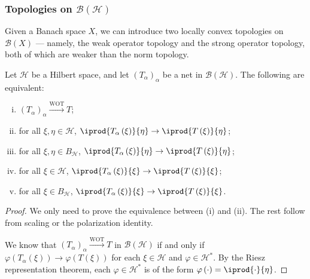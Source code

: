 \documentclass[10pt]{mypackage}
\begin{document}
\subsubsection{Topologies on $\mathcal{B}\left(\mathcal{H}\right)$}%
Given a Banach space $X$, we can introduce two locally convex topologies on $\mathcal{B}\left(X\right)$ --- namely, the weak operator topology and the strong operator topology, both of which are weaker than the norm topology.
\begin{lemma}
  Let $\mathcal{H}$ be a Hilbert space, and let $\left(T_{\alpha}\right)_{\alpha}$ be a net in $\mathcal{B}\left(\mathcal{H}\right)$. The following are equivalent:
  \begin{enumerate}[(i)]
    \item $\left(T_{\alpha}\right)_{\alpha}\xrightarrow{\text{WOT}}T$;
    \item for all $\xi,\eta\in \mathcal{H}$, $ \iprod{T_{\alpha}\left(\xi\right)}{\eta}\rightarrow \iprod{T\left(\xi\right)}{\eta} $;
    \item for all $\xi,\eta\in B_{\mathcal{H}}$, $ \iprod{T_{\alpha}\left(\xi\right)}{\eta}\rightarrow \iprod{T\left(\xi\right)}{\eta} $;
    \item for all $\xi\in \mathcal{H}$, $ \iprod{T_{\alpha}\left(\xi\right)}{\xi} \rightarrow \iprod{T\left(\xi\right)}{\xi} $;
    \item for all $\xi\in B_{\mathcal{H}}$, $ \iprod{T_{\alpha}\left(\xi\right)}{\xi} \rightarrow \iprod{T\left(\xi\right)}{\xi} $.
  \end{enumerate}
\end{lemma}
\begin{proof}
  We only need to prove the equivalence between (i) and (ii). The rest follow from scaling or the polarization identity.\newline

  We know that $\left(T_{\alpha}\right)_{\alpha}\xrightarrow{\text{WOT}}T$ in $\mathcal{B}\left(\mathcal{H}\right)$ if and only if $\varphi\left(T_{\alpha}\left(\xi\right)\right)\rightarrow \varphi\left(T\left(\xi\right)\right)$ for each $\xi\in \mathcal{H}$ and $\varphi\in \mathcal{H}^{\ast}$. By the Riesz representation theorem, each $\varphi\in \mathcal{H}^{\ast}$ is of the form $\varphi\left(\cdot\right) = \iprod{\cdot}{\eta}$.
\end{proof}
\end{document}
